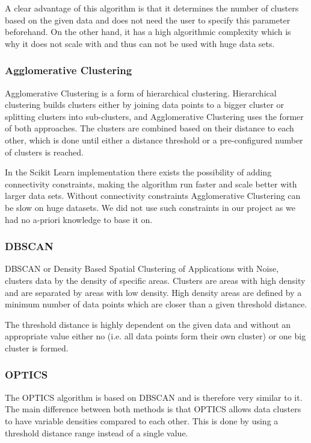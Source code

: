 A clear advantage of this algorithm is that it determines the number of clusters based on the given data and does not need the user to specify this parameter beforehand. On the other hand, it has a high algorithmic complexity which is why it does not scale with and thus can not be used with huge data sets.

\subsubsection{Agglomerative Clustering}
Agglomerative Clustering is a form of hierarchical clustering. Hierarchical clustering builds clusters either by joining data points to a bigger cluster or splitting clusters into sub-clusters, and Agglomerative Clustering uses the former of both approaches. The clusters are combined based on their distance to each other, which is done until either a distance threshold or a pre-configured number of clusters is reached.\cite{yildirim_2020}

In the Scikit Learn implementation there exists the possibility of adding connectivity constraints, making the algorithm run faster and scale better with larger data sets. Without connectivity constraints Agglomerative Clustering can be slow on huge datasets. We did not use such constraints in our project as we had no a-priori knowledge to base it on.

\subsubsection{DBSCAN}
\label{subsubsec:dbscan}
DBSCAN or Density Based Spatial Clustering of Applications with Noise, clusters data by the density of specific areas. Clusters are areas with high density and are separated by areas with low density. High density areas are defined by a minimum number of data points which are closer than a given threshold distance.\cite{dbscan_paper}

The threshold distance is highly dependent on the given data and without an appropriate value either no (i.e. all data points form their own cluster) or one big cluster is formed.

\subsubsection{OPTICS}
The OPTICS algorithm is based on DBSCAN and is therefore very similar to it. The main difference between both methods is that OPTICS allows data clusters to have variable densities compared to each other. This is done by using a threshold distance range instead of a single value.\cite{optics_paper}

